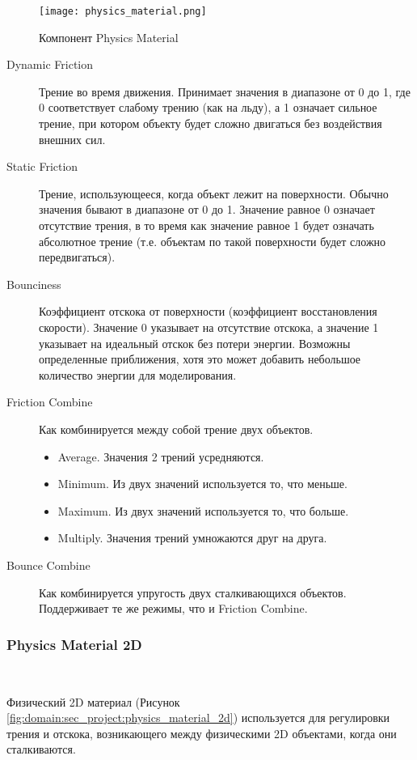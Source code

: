\begin{figure}[h]
	\noindent\centering
	\texttt{[image: physics\_material.png]}  
	\caption{Компонент Physics Material}
	\label{fig:domain:sec_project:physics_material}
\end{figure}

\begin{description}
	\item[Dynamic Friction]	Трение во время движения. Принимает значения в диапазоне от 0 до 1, где 0 соответствует слабому трению (как на льду), а 1 означает сильное трение, при котором объекту будет сложно двигаться без воздействия внешних сил.
	\item[Static Friction] Трение, использующееся, когда объект лежит на поверхности. Обычно значения бывают в диапазоне от 0 до 1. Значение равное 0 означает отсутствие трения, в то время как значение равное 1 будет означать абсолютное трение (т.е. объектам по такой поверхности будет сложно передвигаться).
	\item[Bounciness] Коэффициент отскока от поверхности (коэффициент восстановления скорости). Значение 0 указывает на отсутствие отскока, а значение 1 указывает на идеальный отскок без потери энергии. Возможны определенные приближения, хотя это может добавить небольшое количество энергии для моделирования.
	\item[Friction Combine]	Как комбинируется между собой трение двух объектов.
	\begin{itemize}
		\item Average. Значения 2 трений усредняются.
		\item Minimum. Из двух значений используется то, что меньше.
		\item Maximum. Из двух значений используется то, что больше.
		\item Multiply. Значения трений умножаются друг на друга.
	\end{itemize}
	\item[Bounce Combine] Как комбинируется упругость двух сталкивающихся объектов. Поддерживает те же режимы, что и Friction Combine.
\end{description}

\subsubsection{Physics Material 2D}~

Физический 2D материал (Рисунок \ref{fig:domain:sec_project:physics_material_2d}) используется для регулировки трения и отскока, возникающего между физическими 2D объектами, когда они сталкиваются.

